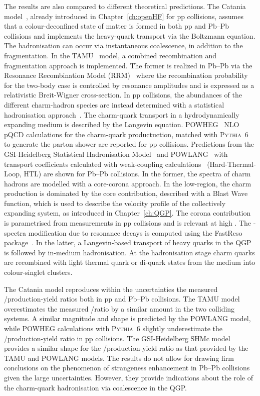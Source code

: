The results are also compared to different theoretical predictions. The Catania model~\cite{Plumari:2017ntm,Scardina:2017ipo}, already introduced in Chapter~\ref{ch:openHF} for pp collisions, assumes that a colour-deconfined state of matter is formed in both pp and Pb--Pb collisions and implements the heavy-quark transport via the Boltzmann equation. The hadronisation can occur via instantaneous coalescence, in addition to the fragmentation. In the TAMU~\cite{He:2019vgs} model, a combined recombination and fragmentation approach is implemented. The former is realized in Pb--Pb via the Resonance Recombination Model (RRM)~\cite{Ravagli:2007xx} where the recombination probability for the two-body case is controlled by resonance amplitudes and is expressed as a relativistic Breit-Wigner cross-section. In pp collisions, the abundances of the different charm-hadron species are instead determined with a statistical hadronisation approach~\cite{He:2019tik}. The charm-quark transport in a hydrodynamically expanding medium
is described by the Langevin equation. POWHEG~\cite{Frixione:2007nw} NLO pQCD calculations for the charm-quark productuction, matched with \textsc{Pythia}~6 to generate the parton shower are reported for pp collisions. Predictions from the GSI-Heidelberg Statistical Hadronisation Model~\cite{Andronic:2021erx} and POWLANG~\cite{Beraudo:2014boa} with transport coefficients calculated with weak-coupling calculations~\cite{Braaten:1989mz} (Hard-Thermal-Loop, HTL) are shown for Pb--Pb collisions. In the former, the \pt spectra of charm hadrons are modelled with a core-corona approach. In the low-\pt region, the charm production is dominated by the core contribution, described with a Blast Wave function, which is used to describe the velocity profile of the collectively expanding system, as introduced in Chapter~\ref{ch:QGP}. The corona contribution is parametrised from measurements in pp collisions and is relevant at high \pt. The \pt-spectra modification due to resonance decays is computed using the FastReso package~\cite{Mazeliauskas:2018irt}. In the latter, a Langevin-based transport of heavy quarks in the QGP is followed by in-medium hadronisation. At the hadronisation stage charm quarks are recombined with light thermal quark or di-quark states from the medium into colour-singlet clusters.

The Catania model reproduces within the uncertainties the measured \ds/\dz production-yield ratios both in pp and Pb--Pb collisions. The TAMU model overestimates the measured \ds/\dz ratio by a similar amount in the two colliding systems. A similar magnitude and \pt shape is predicted by the POWLANG model, while POWHEG calculations with \textsc{Pythia}~6 slightly underestimate the \ds/\dz production-yield ratio in pp collisions. The GSI-Heidelberg SHMc model provides a similar \pt shape for the \ds/\dz production-yield ratio as that provided by the TAMU and POWLANG models. The results do not allow for drawing firm conclusions on the phenomenon of strangeness enhancement in Pb--Pb collisions given the large uncertainties. However, they provide indications about the role of the charm-quark hadronisation via coalescence in the QGP.

